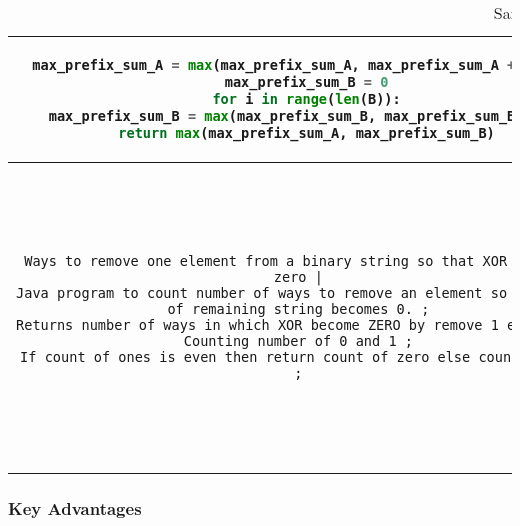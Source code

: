 \documentclass{dhbenelux}
\begin{document}
\begin{table}[h!]
{\begin{tabular}{|c|c|c|}
\begin{minipage}[t]{0.3\textwidth}
\begin{lstlisting}[language=Python, basicstyle=\ttfamily\scriptsize, breaklines=true]
    max_prefix_sum_A = max(max_prefix_sum_A, max_prefix_sum_A + A[i])
  max_prefix_sum_B = 0
  for i in range(len(B)):
    max_prefix_sum_B = max(max_prefix_sum_B, max_prefix_sum_B + B[i])
  return max(max_prefix_sum_A, max_prefix_sum_B)
\end{lstlisting}
\end{minipage}
\\
\hline
\begin{minipage}[t]{0.3\textwidth}
\begin{lstlisting}[basicstyle=\ttfamily\scriptsize, breaklines=true]
Ways to remove one element from a binary string so that XOR becomes zero |
Java program to count number of ways to remove an element so that XOR of remaining string becomes 0. ;
Returns number of ways in which XOR become ZERO by remove 1 element ;
Counting number of 0 and 1 ;
If count of ones is even then return count of zero else count of one ;
\end{lstlisting}
\end{minipage}
&
\begin{minipage}[t]{0.3\textwidth}
\begin{lstlisting}[language=Java, basicstyle=\ttfamily\scriptsize, breaklines=true]
public static int countWays(String str) {
    int count0 = 0;
    int count1 = 0;
    for (int i = 0; i < str.length(); i++) {
      if (str.charAt(i) == '0') {
        count0++;
      } else {
        count1++;
      }
    }
    if (count1 % 2 == 0) {
      return count0;
    } else {
      return count1;
    }
  }
\end{lstlisting}
\end{minipage}
&
\begin{minipage}[t]{0.3\textwidth}
\begin{lstlisting}[language=Python, basicstyle=\ttfamily\scriptsize, breaklines=true]
def count_ways(s):
  count_zero = s.count('0')
  count_one = s.count('1')
  if count_one % 2 == 0:
    return count_zero
  else:
    return count_one
\end{lstlisting}
\end{minipage}
\\
\hline
\end{tabular}
}
\caption{Sample code snippets in a table}
\end{table}

\subsubsection{Key Advantages}
\end{document}

